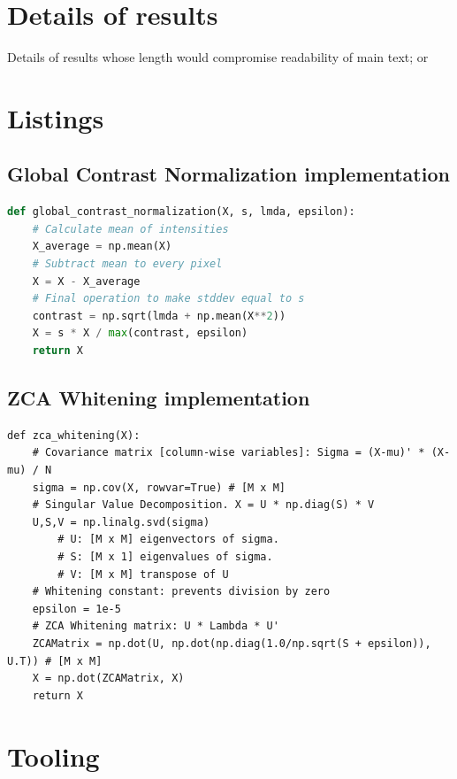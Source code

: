 \documentclass[
  twoside,
  11pt, a4paper,
  footinclude=true,
  headinclude=true,
  cleardoublepage=empty
]{scrbook}
\begin{document}
    \chapter{Details of results} \label{results}
      Details of results whose length would compromise readability of main text; or

    \chapter{Listings} \label{listings}
      \section{Global Contrast Normalization implementation} \label{listings:gcn}
        \begin{lstlisting}[language=Python]
def global_contrast_normalization(X, s, lmda, epsilon):
    # Calculate mean of intensities
    X_average = np.mean(X)
    # Subtract mean to every pixel
    X = X - X_average
    # Final operation to make stddev equal to s
    contrast = np.sqrt(lmda + np.mean(X**2))
    X = s * X / max(contrast, epsilon)
    return X
        \end{lstlisting}

      \section{ZCA Whitening implementation} \label{listings:zca}
        \begin{lstlisting}
def zca_whitening(X):
    # Covariance matrix [column-wise variables]: Sigma = (X-mu)' * (X-mu) / N
    sigma = np.cov(X, rowvar=True) # [M x M]
    # Singular Value Decomposition. X = U * np.diag(S) * V
    U,S,V = np.linalg.svd(sigma)
        # U: [M x M] eigenvectors of sigma.
        # S: [M x 1] eigenvalues of sigma.
        # V: [M x M] transpose of U
    # Whitening constant: prevents division by zero
    epsilon = 1e-5
    # ZCA Whitening matrix: U * Lambda * U'
    ZCAMatrix = np.dot(U, np.dot(np.diag(1.0/np.sqrt(S + epsilon)), U.T)) # [M x M]
    X = np.dot(ZCAMatrix, X)
    return X
        \end{lstlisting}

    \chapter{Tooling} \label{tooling}
\end{document}
